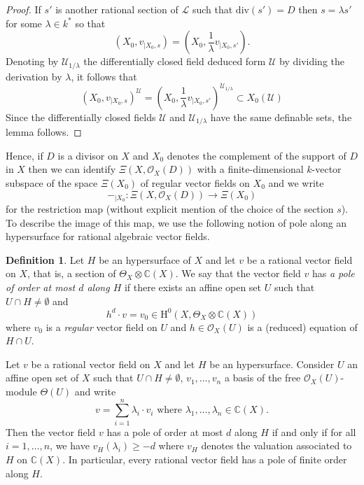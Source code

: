 \documentclass[12pt]{amsart}
\newcommand{\U}{\mathcal{U}}
\theoremstyle{definition}
\newtheorem{definition}{Definition}[subsection]
\theoremstyle{plain}
\theoremstyle{exampstyle}
\theoremstyle{exampstyle}\newtheorem{thmxbis}{Theorem}
\numberwithin{equation}{section}
\theoremstyle{remark}
\begin{document}
\begin{proof} 
If $s'$ is another rational section of $\mathcal L$ such that $\mathrm{div}(s') = D$ then $s = \lambda s'$ for some $\lambda \in k^\ast$ so that 
$$ (X_0,v_{\mid X_0,s}) = (X_0,\frac{1}{\lambda} v_{\mid X_0,s'}).$$
Denoting by $\U_{1/\lambda}$ the differentially closed field deduced form $\mathcal U$ by dividing the derivation by $\lambda$, it follows that
 $$ (X_0,v_{\mid X_0,s})^\U = (X_0,\frac{1}{\lambda} v_{\mid X_0,s'})^{\U_{1/\lambda}} \subset X_0(\U)$$ 
Since the differentially closed fields $\mathcal U$ and $\mathcal U_{1/\lambda}$ have the same definable sets, the lemma follows. 
\end{proof} 

Hence, if $D$ is a divisor on $X$ and $X_0$ denotes the complement of the support of $D$ in $X$ then we can identify $\Xi(X,\mathcal O_X(D))$ with a finite-dimensional $k$-vector subspace of the space $\Xi(X_0)$ of regular vector fields on $X_0$ and we write 
\begin{equation}
-_{\mid X_0} : \Xi(X,\mathcal O_X(D)) \rightarrow \Xi(X_0)
\end{equation}
for the restriction map (without explicit mention of the choice of the section $s$). To describe the image of this map, we use the following notion of pole along an hypersurface for rational algebraic vector fields.

\begin{definition} 
Let $H$ be an hypersurface of $X$ and let $v$ be a rational vector field on $X$, that is, a section of $\Theta_X \otimes \mathbb{C}(X)$. We say that the vector field $v$ has {\em a pole of order at most $d$ along $H$} if there exists an affine open set $U$ such that $U \cap H \neq \emptyset$ and 
$$ h^d \cdot v = v_0 \in \mathrm{H}^0(X,\Theta_X \otimes \mathbb{C}(X)) $$
where $v_0$ is a {\em regular} vector field on $U$ and $h \in \mathcal O_X(U)$ is a (reduced) equation of $H \cap U$.
\end{definition}

{\remark Let $v$ be a rational vector field on $X$ and let $H$ be an hypersurface. Consider $U$ an affine open set of $X$ such that $U \cap H \neq \emptyset$,  $v_1,\ldots, v_n$ a basis of the free $\mathcal O_X(U)$-module  $\Theta(U)$ and write
$$ v = \sum_{i = 1}^n \lambda_i \cdot v_i \text{ where } \lambda_1,\ldots,\lambda_n \in \mathbb{C}(X).$$
Then the vector field $v$ has a pole of order at most $d$ along $H$ if and only if for all $i = 1,\ldots, n$, we have $v_H(\lambda_i) \geq - d$ where $v_H$ denotes the valuation associated to $H$ on $\mathbb{C}(X)$. In particular, every rational vector field has a pole of finite order along $H$.}
\end{document}
